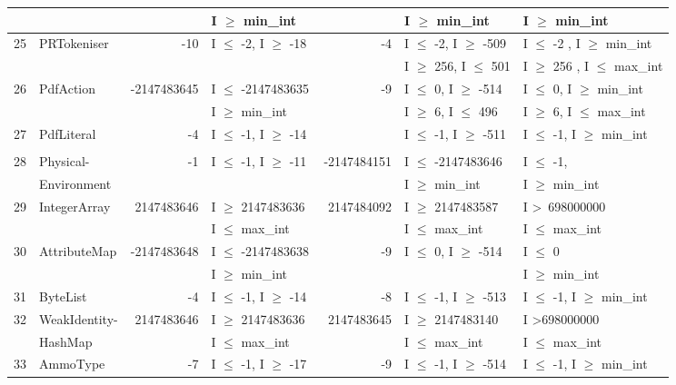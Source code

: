 {\begin{longtable}{|l|l|r|l|r|l|l|}
	&                                             &				& I $\ge$ min\_int			&				& I $\ge$ min\_int				& I $\ge$ min\_int			   	\\\hline
25	& PRTokeniser				&-10			& I $\le$ -2, I $\ge$ -18		&-4 			& I $\le$ -2, I $\ge$ -509			& I $\le$ -2 , I $\ge$ min\_int		\\ 
	&                                             &				& 							& 				& I $\ge$ 256, I $\le$ 501		& I $\ge$ 256 , I $\le$ max\_int	\\\hline
26	& PdfAction					&-2147483645	& I $\le$ -2147483635 		&-9 			& I $\le$ 0, I $\ge$ -514			& I $\le$ 0, I $\ge$ min\_int 		\\ 
	&                                             &				& I $\ge$ min\_int			&				& I $\ge$ 6, I $\le$ 496			& I $\ge$ 6,  I $\le$ max\_int		\\\hline
27	& PdfLiteral					&-4				& I $\le$ -1, I $\ge$ -14		&				& I $\le$ -1, I $\ge$ -511			& I $\le$ -1, I $\ge$ min\_int		\\ 
	&							&				&							&				&								&								\\\hline
28	& Physical-					&-1 			& I $\le$ -1, I $\ge$ -11		&-2147484151	& I $\le$ -2147483646			& I $\le$ -1, 							\\ 
	& Environment				&				& 							&				& I $\ge$ min\_int	 			& I $\ge$ min\_int				\\ \hline
29	& IntegerArray				&2147483646	& I $\ge$ 2147483636		&~2147484092	& I $\ge$ 2147483587			& I \textgreater~698000000				\\ 
	&                                             &				& I $\le$ max\_int			&				& I $\le$ max\_int				&  I $\le$ max\_int				\\\hline
30	& AttributeMap				&-2147483648	& I $\le$ -2147483638		&-9				& I $\le$ 0, I $\ge$ -514			& I $\le$ 0								\\ 
	&                                             &				& I $\ge$ min\_int			&				& 								& I $\ge$ min\_int 			   	\\	\hline
31	& ByteList					&-4 			& I $\le$ -1, I $\ge$ -14		&-8 			& I $\le$ -1, I $\ge$ -513			& I $\le$ -1, I $\ge$ min\_int	\\ \hline
32	& WeakIdentity-				&2147483646	& I $\ge$ 2147483636		&~2147483645	& I $\ge$ 2147483140			& I \textgreater 698000000				\\ 
	& HashMap                              &				& I $\le$ max\_int			&				& I $\le$ max\_int				& I $\le$ max\_int					\\\hline
33	& AmmoType				&-7 			& I $\le$ -1, I $\ge$ -17		&-9 			& I $\le$ -1, I $\ge$ -514			& I $\le$ -1, I $\ge$ min\_int	\\ 			

\end{longtable}}
